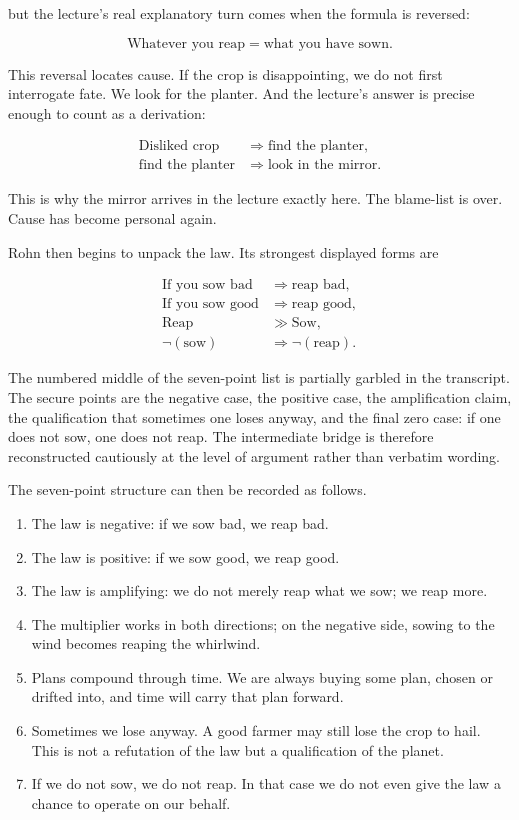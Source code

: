 but the lecture's real explanatory turn comes when the formula is reversed:

\begin{equation}
\text{Whatever you reap}=\text{what you have sown}.
\end{equation}

This reversal locates cause. If the crop is disappointing, we do not first interrogate fate. We look for the planter. And the lecture's answer is precise enough to count as a derivation:

\begin{align}
\text{Disliked crop} &\Longrightarrow \text{find the planter},\\
\text{find the planter} &\Longrightarrow \text{look in the mirror}.
\end{align}

This is why the mirror arrives in the lecture exactly here. The blame-list is over. Cause has become personal again.

Rohn then begins to unpack the law. Its strongest displayed forms are

\begin{align}
\text{If you sow bad} &\Longrightarrow \text{reap bad},\\
\text{If you sow good} &\Longrightarrow \text{reap good},\\
\text{Reap} &\gg \text{Sow},\\
\neg(\text{sow}) &\Longrightarrow \neg(\text{reap}).
\end{align}

\begin{remark}
The numbered middle of the seven-point list is partially garbled in the transcript. The secure points are the negative case, the positive case, the amplification claim, the qualification that sometimes one loses anyway, and the final zero case: if one does not sow, one does not reap. The intermediate bridge is therefore reconstructed cautiously at the level of argument rather than verbatim wording.
\end{remark}

The seven-point structure can then be recorded as follows.

\begin{enumerate}
\item The law is negative: if we sow bad, we reap bad.
\item The law is positive: if we sow good, we reap good.
\item The law is amplifying: we do not merely reap what we sow; we reap more.
\item The multiplier works in both directions; on the negative side, sowing to the wind becomes reaping the whirlwind.
\item Plans compound through time. We are always buying some plan, chosen or drifted into, and time will carry that plan forward.
\item Sometimes we lose anyway. A good farmer may still lose the crop to hail. This is not a refutation of the law but a qualification of the planet.
\item If we do not sow, we do not reap. In that case we do not even give the law a chance to operate on our behalf.
\end{enumerate}


